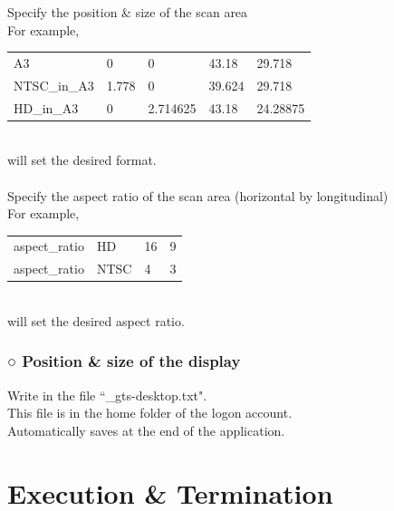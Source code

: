 \documentclass[a4paper,10pt]{article}
\begin{document}
\noindent Specify the position \& size of the scan area\\
For example,\\[-1.25em]

\setlength{\tabcolsep}{0em}
\renewcommand{\arraystretch}{1.0}
\noindent\begin{tabular}{p{8.5em}p{8.5em}p{8.5em}p{8.5em}l}
A3 & 0 & 0 & 43.18 & 29.718\\
NTSC\_in\_A3 & 1.778 & 0 & 39.624 & 29.718\\
HD\_in\_A3 & 0 & 2.714625 & 43.18 & 24.28875\\
\end{tabular}\\[-0.5em]

\noindent will set the desired format.\\
\\
Specify the aspect ratio of the scan area (horizontal by longitudinal)\\
For example,\\[-1.25em]

\setlength{\tabcolsep}{0em}
\renewcommand{\arraystretch}{1.0}
\noindent\begin{tabular}{p{8.5em}p{8.5em}p{8.5em}l}
aspect\_ratio & HD & 16 & 9\\
aspect\_ratio & NTSC & 4 & 3\\
\end{tabular}\\[-0.5em]

\noindent will set the desired aspect ratio.\\

\subsubsection*{○ Position \& size of the display}

\noindent Write in the file “\_gts-desktop.txt".\\
This file is in the home folder of the logon account.\\
Automatically saves at the end of the application.

\newpage

\section*{Execution \& Termination}
\end{document}
